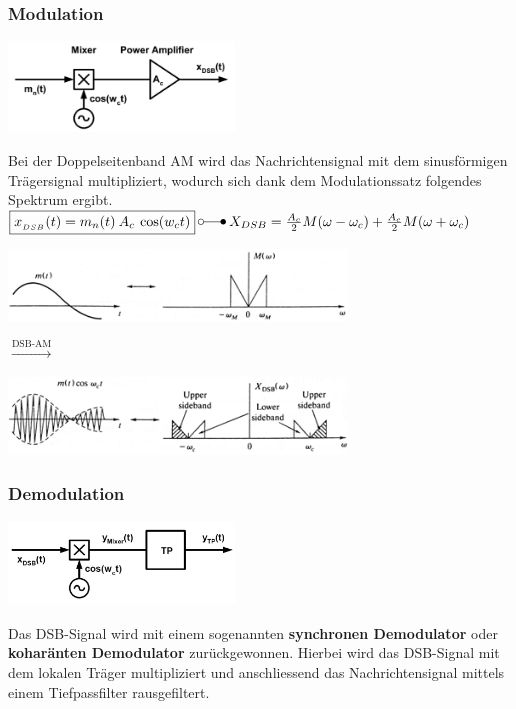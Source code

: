 \subsubsection{Modulation}
\begin{minipage}[c][2.7cm][t]{6.5cm}
    \includegraphics[width=6cm]{bilder/am_dsb_modulation.png}
\end{minipage}
\begin{minipage}[c][2.7cm][t]{11.5cm}
Bei der Doppelseitenband AM wird das Nachrichtensignal mit dem sinusförmigen Trägersignal
multipliziert, wodurch sich dank dem Modulationssatz folgendes Spektrum ergibt. \\
	$ \boxed{x_{_{DSB}}(t) = m_n(t) \: A_c \: \cos(w_c t)} \: \laplace 
	\: X_{DSB} = \frac{A_c}{2}M(\omega - \omega_c) + \frac{A_c}{2}M(\omega + \omega_c)$
\end{minipage}

\begin{minipage}[c]{9cm}
    \includegraphics[width=9cm]{bilder/am_dsb_nachrichtensignal.png}
\end{minipage}
$\xrightarrow{\text{DSB-AM}}$
\begin{minipage}[c]{9cm}
    \includegraphics[width=9cm]{bilder/am_dsb_spektrum.png}
\end{minipage}

\subsubsection{Demodulation} 
\label{am_dsb_modulation}
\begin{minipage}[t][2.3cm][c]{6.5cm}
    \includegraphics[width=6cm]{bilder/am_dsb_demodulation}
\end{minipage}
\begin{minipage}[t][2.3cm][c]{11.5cm}
	Das DSB-Signal wird mit einem sogenannten \textbf{synchronen Demodulator} oder \textbf{koharänten
	Demodulator} zurückgewonnen. Hierbei wird das DSB-Signal mit dem lokalen Träger
	multipliziert und anschliessend das Nachrichtensignal mittels einem Tiefpassfilter rausgefiltert.
	\\ 
\end{minipage} \\

